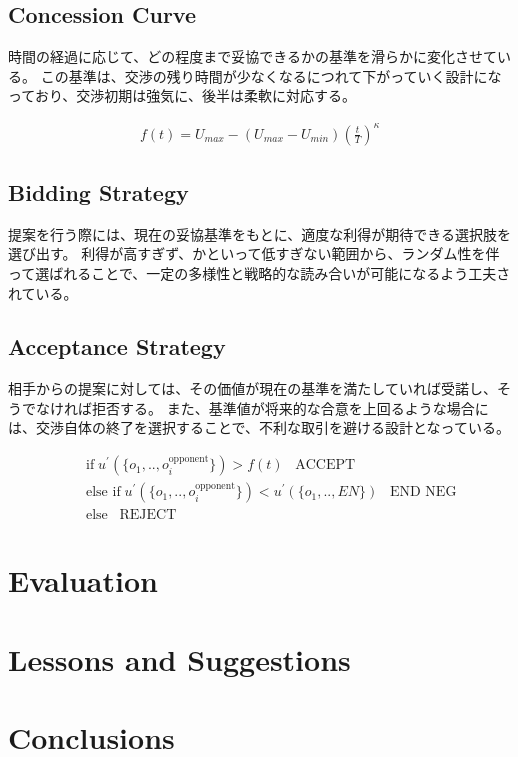 \documentclass{article}
\begin{document}
\subsection{Concession Curve}
時間の経過に応じて、どの程度まで妥協できるかの基準を滑らかに変化させている。
この基準は、交渉の残り時間が少なくなるにつれて下がっていく設計になっており、交渉初期は強気に、後半は柔軟に対応する。

\begin{eqnarray}
	f(t) = U_{max} - (U_{max} - U_{min})\left(\frac{t}{T}\right)^{\kappa}
\end{eqnarray}

\subsection{Bidding Strategy}
提案を行う際には、現在の妥協基準をもとに、適度な利得が期待できる選択肢を選び出す。
利得が高すぎず、かといって低すぎない範囲から、ランダム性を伴って選ばれることで、一定の多様性と戦略的な読み合いが可能になるよう工夫されている。

\subsection{Acceptance Strategy}
相手からの提案に対しては、その価値が現在の基準を満たしていれば受諾し、そうでなければ拒否する。
また、基準値が将来的な合意を上回るような場合には、交渉自体の終了を選択することで、不利な取引を避ける設計となっている。

\begin{eqnarray}
	&&\text{if}\;u^{\prime}(\{o_1,..,o_i^{\text{opponent}}\}) > f(t)\;\;\;\text{ACCEPT}\\
	&&\text{else if}\;u^{\prime}(\{o_1,..,o_i^{\text{opponent}}\}) < u^{\prime}(\{o_1,..,EN\})\;\;\;\text{END NEG}\\
	&&\text{else}\;\;\;\text{REJECT}
\end{eqnarray}

\section{Evaluation}

\section{Lessons and Suggestions}

\section*{Conclusions}
\end{document}
